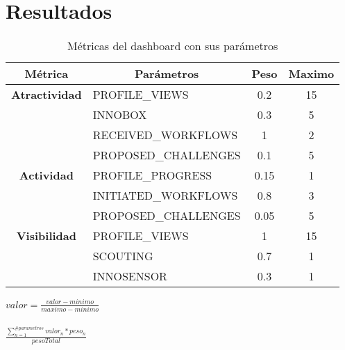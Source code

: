 \chapter*{Resultados}
\begin{table}[ht]
\centering
\caption{Métricas del dashboard con sus parámetros}
\label{table3}
\begin{tabular}{|c|l|c|c|}
\hline
\textbf{Métrica} & \multicolumn{1}{c|}{\textbf{Parámetros}} & \textbf{Peso} & \multicolumn{1}{l|}{\textbf{Maximo}} \\ \hline
{\textbf{Atractividad}} & PROFILE\_VIEWS & 0.2 & 15 \\ \cline{2-4} 
 & INNOBOX & 0.3 & 5 \\ \cline{2-4} 
 & RECEIVED\_WORKFLOWS & 1 & 2 \\ \cline{2-4} 
 & PROPOSED\_CHALLENGES & 0.1 & 5 \\ \hline
{\textbf{Actividad}} & PROFILE\_PROGRESS & 0.15 & 1 \\ \cline{2-4} 
 & INITIATED\_WORKFLOWS & 0.8 & 3 \\ \cline{2-4} 
 & PROPOSED\_CHALLENGES & 0.05 & 5 \\ \hline
{\textbf{Visibilidad}} & PROFILE\_VIEWS & 1 & 15 \\ \cline{2-4} 
 & SCOUTING & 0.7 & 1 \\ \cline{2-4} 
 & INNOSENSOR & 0.3 & 1 \\ \hline
\end{tabular}
\end{table}


$valor=\frac{valor - minimo}{maximo - minimo}$\\\\
$\frac{\sum_{n = 1}^{\# parametros} valor_{n} * peso_{n}}{pesoTotal}$